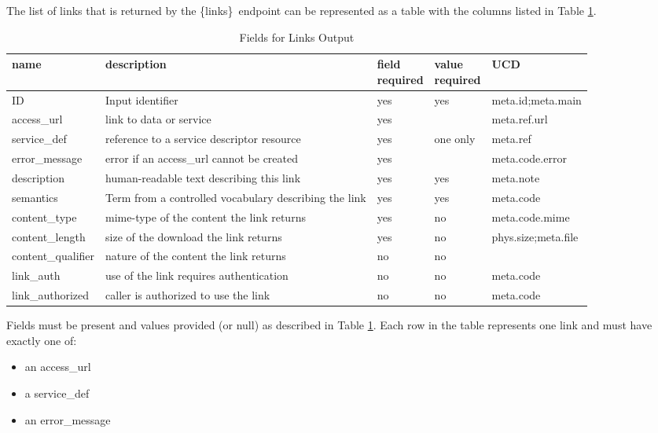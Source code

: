 \documentclass[11pt,a4paper]{ivoa}
\newcommand{\blinks}{\{links\}}
\begin{document}
The list of links that is returned by the \blinks\ endpoint can be
represented as a table with the columns listed in Table \ref{fig:linkFields}. 
\begin{table}[h]
\begin{center}
\begin{tabular}{|l|p{}|p{}|p{}|l|}
\hline
{\bf name}      & {\bf description} & {\bf field \newline required}
                & {\bf value \newline required} & {\bf UCD} \\
\hline
ID              & Input identifier & yes & yes & meta.id;meta.main \\
\hline
access\_url     & link to data or service 
                & yes &          & meta.ref.url \\
\cline{1-3} \cline{5-5}
service\_def    & reference to a service descriptor resource
                & yes & one only & meta.ref \\
\cline{1-3} \cline{5-5}
error\_message  & error if an access\_url cannot be created
                & yes &          & meta.code.error \\
\hline
description     & human-readable text describing this link
                & yes & yes & meta.note \\
\hline
semantics       & Term from a controlled vocabulary describing the link
                & yes & yes & meta.code \\
\hline
content\_type   & mime-type of the content the link returns
                & yes & no & meta.code.mime \\
\hline
content\_length & size of the download the link returns
                & yes & no & phys.size;meta.file \\
\hline
content\_qualifier & nature of the content the link returns
                & no & no & \\
\hline
link\_auth       & use of the link requires authentication
                 & no & no & meta.code \\
\hline
link\_authorized & caller is authorized to use the link
                 & no & no & meta.code \\
\hline
\end{tabular}
\end{center}
\caption{Fields for Links Output}
\label{fig:linkFields}
\end{table}

Fields must be present and values provided
(or null) as described in Table \ref{fig:linkFields}. Each row in the table
represents one link and must have exactly one of:
\begin{itemize}
  \item an access\_url
  \item a service\_def
  \item an error\_message
\end{itemize}
\end{document}
